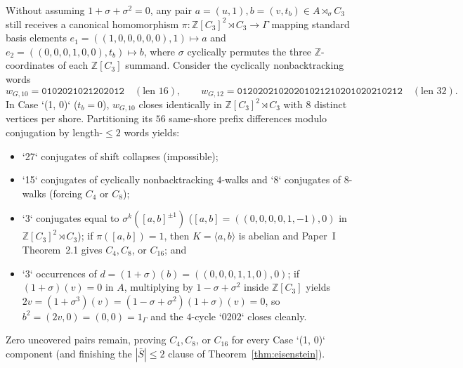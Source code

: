\documentclass[11pt]{amsart}
\theoremstyle{definition}
\theoremstyle{remark}
\newcommand{\Z}{\mathbb{Z}}
\begin{document}
Without assuming $1 + \sigma + \sigma^2 = 0$, any pair $a = (u, 1), b = (v, t_b) \in A \rtimes_\sigma C_3$ still receives a canonical homomorphism $\pi : \Z[C_3]^2 \rtimes C_3 \to \Gamma$ mapping standard basis elements $e_1 = ((1,0,0,0,0,0), 1) \mapsto a$ and $e_2 = ((0,0,0,1,0,0), t_b) \mapsto b$, where $\sigma$ cyclically permutes the three $\Z$-coordinates of each $\Z[C_3]$ summand. Consider the cyclically nonbacktracking words
\[
w_{G,10} = \mathtt{0102021021202012} \quad (\text{len } 16),\qquad
w_{G,12} = \mathtt{01202021020201021210201020210212} \quad (\text{len } 32).
\]
In Case `(1, 0)` ($t_b = 0$), $w_{G,10}$ closes identically in $\Z[C_3]^2 \rtimes C_3$ with $8$ distinct vertices per shore. Partitioning its $56$ same-shore prefix differences modulo conjugation by length-$\le 2$ words yields:
\begin{itemize}
\item `27` conjugates of shift collapses (impossible);
\item `15` conjugates of cyclically nonbacktracking $4$-walks and `8` conjugates of $8$-walks (forcing $C_4$ or $C_8$);
\item `3` conjugates equal to $\sigma^k([a,b]^{\pm 1})$ ($[a,b] = ((0,0,0,0,1,-1), 0)$ in $\Z[C_3]^2 \rtimes C_3$); if $\pi([a,b]) = 1$, then $K = \langle a,b \rangle$ is abelian and Paper~I Theorem~2.1 gives $C_4, C_8$, or $C_{16}$; and
\item `3` occurrences of $d = (1 + \sigma)(b) = ((0,0,0,1,1,0), 0)$; if $(1 + \sigma)(v) = 0$ in $A$, multiplying by $1 - \sigma + \sigma^2$ inside $\Z[C_3]$ yields $2v = (1 + \sigma^3)(v) = (1 - \sigma + \sigma^2)(1 + \sigma)(v) = 0$, so $b^2 = (2v, 0) = (0,0) = 1_\Gamma$ and the $4$-cycle `0202` closes cleanly.
\end{itemize}
Zero uncovered pairs remain, proving $C_4, C_8$, or $C_{16}$ for every Case `(1, 0)` component (and finishing the $|\bar{S}| \le 2$ clause of Theorem~\ref{thm:eisenstein}).
\end{document}
